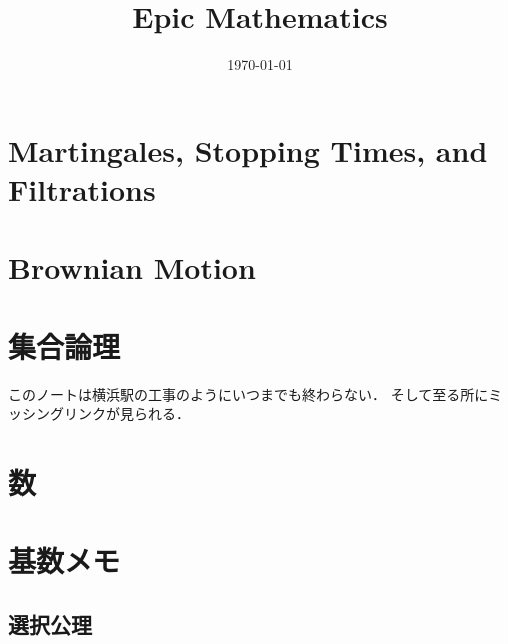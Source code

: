\documentclass[a4j,10.5pt,oneside,openany]{jsbook}
\title{Epic Mathematics}
\author{}
\date{\today}
\theoremstyle{mystyle}
\begin{document}
%
%
\maketitle


%
%
\tableofcontents
\frontmatter
%
\mainmatter
%
\chapter{Martingales, Stopping Times, and Filtrations}








\chapter{Brownian Motion}









\appendix
\chapter{集合論理}
	このノートは横浜駅の工事のようにいつまでも終わらない．
	そして至る所にミッシングリンクが見られる．
	\label{sec:logic_and_set_theory}
	
	
	
	
	
	
	
	
	
	
	
\chapter{数}
	
	
	
	
	
	
	
\chapter{基数メモ}
	\section{選択公理}
		
\end{document}
